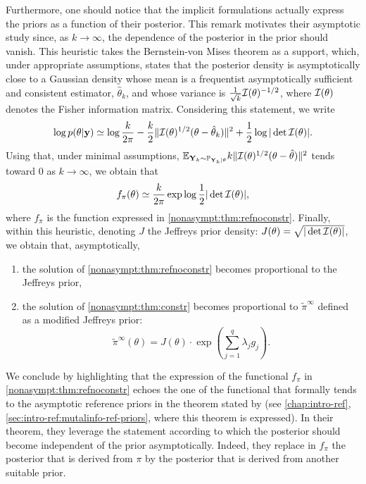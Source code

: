 Furthermore, one should notice that the implicit formulations actually express the priors as a function of their posterior. This remark motivates their asymptotic study since, as $k\rightarrow\infty$, the dependence of the posterior in the prior should vanish.
This heuristic takes the Bernstein-von Mises theorem as a support, which, under appropriate assumptions, states that the posterior density is asymptotically close to a Gaussian density whose mean is a frequentist asymptotically sufficient and consistent estimator, $\hat\theta_k$, and whose variance is $\frac{1}{\sqrt{k}}\mathcal{I}(\theta)^{-1/2}$, where $\mathcal{I}(\theta)$ denotes the Fisher information matrix.
Considering this statement, we write
    \begin{equation}
        \log p(\theta|\mathbf{y}) \simeq \log \frac{k}{2\pi} - \frac{k}{2}\|\mathcal{I}(\theta)^{1/2}(\theta-\hat\theta_k)\|^2 +\frac{1}{2}\log|\det\mathcal{I}(\theta)|.
    \end{equation}
Using that, under minimal assumptions, $\mathbb{E}_{\mathbf{Y}_k\sim\mathbb{P}_{\mathbf{Y}_k|\theta}}k\|\mathcal{I}(\theta)^{1/2}(\theta-\hat\theta) \|^2$ tends toward $0$ as $k\rightarrow\infty$, we obtain that
    \begin{equation}
        f_\pi(\theta)\simeq \frac{k}{2\pi}\exp\log\frac{1}{2}|\det\mathcal{I}(\theta)|,
    \end{equation}
where $f_\pi$ is the function expressed in \cref{nonasympt:thm:refnoconstr}. 
Finally, within this heuristic, denoting $J$ the Jeffreys prior density: $J(\theta)=\sqrt{|\det\mathcal{I}(\theta)|}$, we obtain that, asymptotically, 
\begin{enumerate}
    \item the solution of \cref{nonasympt:thm:refnoconstr} becomes proportional to the Jeffreys prior,
    \item the solution of \cref{nonasympt:thm:constr} becomes proportional to $\tilde\pi^\infty$ defined as a modified Jeffreys prior:
        \begin{equation}
            \tilde\pi^\infty(\theta) = J(\theta)\cdot\exp\left(\sum_{j=1}^{q}\lambda_jg_j\right).
        \end{equation}
\end{enumerate}


We conclude by highlighting that the expression of the functional $f_\pi$ in \cref{nonasympt:thm:refnoconstr} echoes the one of the functional that formally tends to the asymptotic reference priors in the theorem stated by \citet{berger_formal_2009} (see \cref{chap:intro-ref}, \cref{sec:intro-ref:mutalinfo-ref-priors}, where this theorem is expressed).
In their theorem, they leverage the statement according to which the posterior should become independent of the prior asymptotically. Indeed, they replace in $f_\pi$ the posterior that is derived from $\pi$ by the posterior that is derived from another suitable prior. %

















